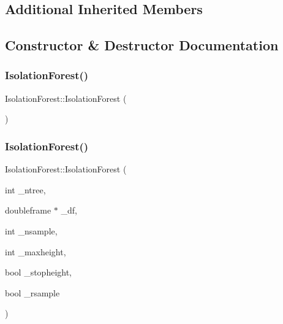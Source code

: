 \subsection*{Additional Inherited Members}


\subsection{Constructor \& Destructor Documentation}
\mbox{\label{classIsolationForest_a381db4db6b4c0b3e532f67398b50e32a}} 
\subsubsection{\texorpdfstring{Isolation\+Forest()}{IsolationForest()}\hspace{0.1cm}{\footnotesize\ttfamily [1/2]}}
{\footnotesize\ttfamily Isolation\+Forest\+::\+Isolation\+Forest (\begin{DoxyParamCaption}{ }\end{DoxyParamCaption})\hspace{0.3cm}{\ttfamily [default]}}

\mbox{\label{classIsolationForest_aa81cd568d5db199124cf381615cece42}} 
\subsubsection{\texorpdfstring{Isolation\+Forest()}{IsolationForest()}\hspace{0.1cm}{\footnotesize\ttfamily [2/2]}}
{\footnotesize\ttfamily Isolation\+Forest\+::\+Isolation\+Forest (\begin{DoxyParamCaption}\item[{int}]{\+\_\+ntree,  }\item[{doubleframe $\ast$}]{\+\_\+df,  }\item[{int}]{\+\_\+nsample,  }\item[{int}]{\+\_\+maxheight,  }\item[{bool}]{\+\_\+stopheight,  }\item[{bool}]{\+\_\+rsample }\end{DoxyParamCaption})}

